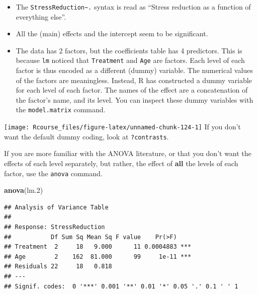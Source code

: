 \documentclass[]{book}
\newenvironment{Shaded}{\begin{snugshade}}{\end{snugshade}}
\newcommand{\KeywordTok}[1]{\textcolor[rgb]{0.13,0.29,0.53}{\textbf{#1}}}
\newcommand{\DecValTok}[1]{\textcolor[rgb]{0.00,0.00,0.81}{#1}}
\newcommand{\StringTok}[1]{\textcolor[rgb]{0.31,0.60,0.02}{#1}}
\newcommand{\OperatorTok}[1]{\textcolor[rgb]{0.81,0.36,0.00}{\textbf{#1}}}
\newcommand{\NormalTok}[1]{#1}
\theoremstyle{definition}
\theoremstyle{definition}
\theoremstyle{definition}
\theoremstyle{remark}
\begin{document}
\begin{itemize}
\item
  The \texttt{StressReduction\textasciitilde{}.} syntax is read as
  ``Stress reduction as a function of everything else''.
\item
  All the (main) effects and the intercept seem to be significant.
\item
  The data has 2 factors, but the coefficients table has 4 predictors.
  This is because \texttt{lm} noticed that \texttt{Treatment} and
  \texttt{Age} are factors. Each level of each factor is thus encoded as
  a different (dummy) variable. The numerical values of the factors are
  meaningless. Instead, R has constructed a dummy variable for each
  level of each factor. The names of the effect are a concatenation of
  the factor's name, and its level. You can inspect these dummy
  variables with the \texttt{model.matrix} command.
\end{itemize}

\begin{Shaded}
\end{Shaded}

\texttt{[image: Rcourse\_files/figure-latex/unnamed-chunk-124-1]}
If you don't want the default dummy coding, look at \texttt{?contrasts}.

If you are more familiar with the ANOVA literature, or that you don't
want the effects of each level separately, but rather, the effect of
\textbf{all} the levels of each factor, use the \texttt{anova} command.

\begin{Shaded}
\begin{Highlighting}[]
\KeywordTok{anova}\NormalTok{(lm.}\DecValTok{2}\NormalTok{)}
\end{Highlighting}
\end{Shaded}

\begin{verbatim}
## Analysis of Variance Table
## 
## Response: StressReduction
##           Df Sum Sq Mean Sq F value    Pr(>F)    
## Treatment  2     18   9.000      11 0.0004883 ***
## Age        2    162  81.000      99     1e-11 ***
## Residuals 22     18   0.818                      
## ---
## Signif. codes:  0 '***' 0.001 '**' 0.01 '*' 0.05 '.' 0.1 ' ' 1
\end{verbatim}
\end{document}
